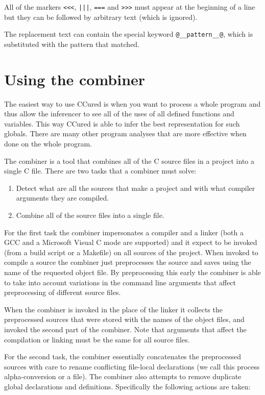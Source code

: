 \documentclass{book}
\def\t#1{{\tt #1}}
\begin{document}
 All of the markers \t{<<<}, \t{|||}, \t{===} and \t{>>>} must appear at the
beginning of a line but they can be followed by arbitrary text (which is
ignored).

 The replacement text can contain the special keyword \t{@\_\_pattern\_\_@},
which is substituted with the pattern that matched. 

  \chapter{Using the combiner}

 The easiest way to use CCured is when you want to process a whole program and
thus allow the inferencer to see all of the uses of all defined functions and
variables. This way CCured is able to infer the best representation for such
globals. There are many other program analyses that are more effective when
done on the whole program.

 The combiner is a tool that combines all of the C source files in a project
into a single C file. There are two tasks that a combiner must solve:
\begin{enumerate}
\item Detect what are all the sources that make a project and with what
compiler arguments they are compiled.

\item Combine all of the source files into a single file. 
\end{enumerate}

 For the first task the combiner impersonates a compiler and a linker (both a
GCC and a Microsoft Visual C mode are supported) and it expect to be invoked
(from a build script or a Makefile) on all sources of the project. When
invoked to compile a source the combiner just preprocesses the source and
saves using the name of the requested object file. By preprocessing this early
the combiner is able to take into account variations in the command line
arguments that affect preprocessing of different source files. 

 When the combiner is invoked in the place of the linker it collects the
preprocessed sources that were stored with the names of the object files, and
invoked the second part of the combiner. Note that arguments that affect the
compilation or linking must be the same for all source files.

 For the second task, the combiner essentially concatenates the preprocessed
sources with care to rename conflicting file-local declarations (we call this
process alpha-conversion or a file). The combiner also attempts to remove
duplicate global declarations and definitions. Specifically the following
actions are taken: 
\end{document}

